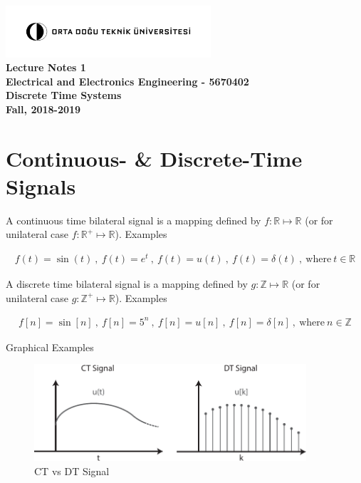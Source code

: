 \documentclass[12pt,oneside]{amsart}
\begin{document}
\begin{center}
  \bf
  \includegraphics[width=3in]{metu_logo} \\
Lecture Notes 1\\
 Electrical and Electronics Engineering - 5670402 \\ 
 Discrete Time Systems \\
 Fall, 2018-2019 
\end{center}

\vspace{12pt}

\section{Continuous- \& Discrete-Time Signals} 

\vspace{12pt}

A continuous time bilateral signal is a mapping defined by $f:
\mathbb{R} \mapsto \mathbb{R}$ (or for unilateral case $f:
\mathbb{R}^+ \mapsto \mathbb{R}$). Examples

\begin{align*}
  f(t) = \sin (t) \ , \
  f(t) = e^t \ , \
  f(t) = u(t) \ , \
  f(t) = \delta(t) \ , \ \mathrm{where} \ t \in \mathbb{R}
\end{align*}

\vspace{6pt}

A discrete time bilateral signal is a mapping defined by $g:
\mathbb{Z} \mapsto \mathbb{R}$ (or for unilateral case $g:
\mathbb{Z}^+ \mapsto \mathbb{R}$). Examples

\begin{align*}
  f[n] = \sin [n] \ , \
  f[n] = 5^n \ , \
  f[n] = u[n] \ , \
  f[n] = \delta[n] \ , \ \mathrm{where} \ n \in \mathbb{Z}
\end{align*}

\vspace{6pt}

Graphical Examples

\begin{figure}[h]
    \centering
      \includegraphics[width=0.9\textwidth]{signals}
    \caption{CT vs DT Signal}
\end{figure}
\end{document}
